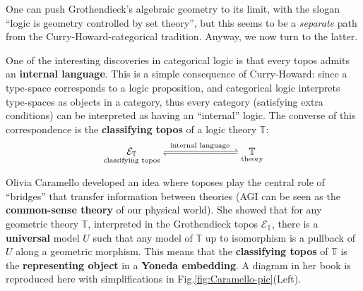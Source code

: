 \documentclass[runningheads]{llncs}
\begin{document}
One can push Grothendieck's algebraic geometry to its limit, with the slogan ``logic is geometry controlled by set theory'', but this seems to be a \textit{separate} path from the Curry-Howard-categorical tradition.  Anyway, we now turn to the latter.


One of the interesting discoveries in categorical logic is that every topos admits an \textbf{internal language}.  This is a simple consequence of Curry-Howard: since a type-space corresponds to a logic proposition, and categorical logic interprets type-spaces as objects in a category, thus every category (satisfying extra conditions) can be interpreted as having an ``internal'' logic.  The converse of this correspondence is the \textbf{classifying topos} of a logic theory $\mathbb{T}$:
\begin{equation}
\underset{\footnotesize\text{classifying topos}}{\mathcal{E}_\mathbb{T}} \xrightleftharpoons[]{\; \text{ internal language } \;} \underset{\footnotesize\text{theory}}{\mathbb{T}}
\end{equation}

Olivia Caramello \cite{Caramello2018} developed an idea where toposes play the central role of ``bridges'' that transfer information between theories (AGI can be seen as the \textbf{common-sense theory} of our physical world).  She showed that for any geometric theory $\mathbb{T}$, interpreted in the Grothendieck topos $\mathcal{E}_\mathbb{T}$, there is a \textbf{universal} model $U$ such that any model of $\mathbb{T}$ up to isomorphism is a pullback of $U$ along a geometric morphism.  This means that the \textbf{classifying topos} of $\mathbb{T}$ is the \textbf{representing object} in a \textbf{Yoneda embedding}.  A diagram in her book is reproduced here with simplifications in Fig.\ref{fig:Caramello-pic}(Left).
\end{document}
